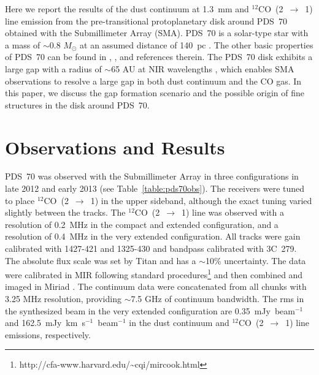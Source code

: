 \documentclass[apj]{emulateapj-rtx4}
\begin{document}
  Here we report the results of the dust continuum at 1.3~mm and $^{12}$CO~(2~$\rightarrow$~1) line emission
  from the pre-transitional protoplanetary disk around PDS~70 obtained with the Submillimeter Array (SMA).
  PDS~70 is a solar-type star with a mass of $\sim$0.8 $M_{\odot}$ at an assumed distance of 140~pc \citep{riau06}.
  The other basic properties of PDS~70 can be found in \citet{hash12}, \citet{dong12b}, and references therein. 
    The PDS~70 disk exhibits a large gap
  with a radius of $\sim$65 AU at NIR wavelengths \citep{hash12,dong12b}, which
  enables SMA observations to resolve a large gap in both dust continuum and the CO gas.
    In this paper, we discuss the gap formation scenario and the possible origin of fine structures in the disk 
    around PDS~70.

  \section{Observations and Results}\label{sec:obs}

  PDS~70 \citep[14:08:10.125, $-$41:23:52.81;][]{cutr13} was observed with the Submillimeter
  Array in three configurations in late 2012 and early 2013 (see Table~\ref{table:pds70obs}). 
  The receivers were tuned to place $^{12}$CO~(2~$\rightarrow$~1) in the
  upper sideband, although the exact tuning varied slightly between the
  tracks. The $^{12}$CO~(2~$\rightarrow$~1) line was observed with a resolution of 0.2~MHz in
  the compact and extended configuration, and a resolution of
  0.4~MHz in the very extended configuration. All tracks were gain
  calibrated with 1427-421 and 1325-430 and bandpass calibrated with
  3C~279. 
  The absolute flux scale was set by Titan and has a $\sim$10\%
  uncertainty. The data were calibrated in MIR following standard
  procedures\footnote{http://cfa-www.harvard.edu/\~{}cqi/mircook.html} and
  then combined and imaged in Miriad \citep{saul95}. The continuum data
  were concatenated from all chunks with 3.25 MHz resolution, providing
  $\sim$7.5 GHz of continuum bandwidth. The rms in the synthesized beam in
  the very extended configuration are 0.35~mJy~beam$^{-1}$ and 162.5~mJy~km~s$^{-1}$~beam$^{-1}$
  in the dust continuum and $^{12}$CO~(2~$\rightarrow$~1) line emissions, respectively.
\end{document}

